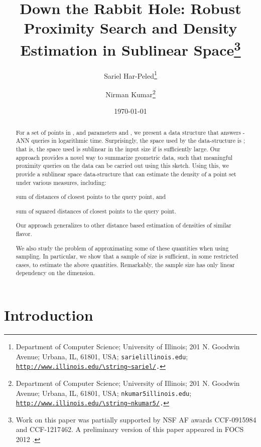 \documentclass[12pt]{article}
\makeatletter
\newcommand{\Term}[1]{\textsf{#1}}
\newcommand{\TermI}[1]{\Term{#1}\index{#1@\Term{#1}}}
\theoremstyle{remark}{\theorembodyfont{\rm} \newtheorem{remark}[theorem]{Remark}}
\newcommand{\SarielThanks}[1]{\thanks{Department of Computer
      Science; 
      University of Illinois; 
      201 N. Goodwin Avenue;
      Urbana, IL, 61801, USA;
      {\tt sariel\atgen{}illinois.edu}; {\tt
         \url{http://www.illinois.edu/\string~sariel/}.} #1}}
\newcommand{\NirmanThanks}[1]{\thanks{Department of Computer
      Science; 
      University of Illinois; 
      201 N. Goodwin Avenue;
      Urbana, IL, 61801, USA;
      {\tt \si{nkumar5}\atgen{}illinois.edu}; {\tt
         \url{http://www.illinois.edu/\string~\si{nkumar5}/}.} #1}}
\newcommand{\atgen}{\symbol{'100}}
\providecommand{\si}[1]{#1}
\newcommand{\ANN}{\TermI{ANN}\xspace}
\makeatother
\begin{document}
\title{Down the Rabbit Hole: Robust Proximity Search and Density
   Estimation in Sublinear Space\footnote{Work on this paper was partially supported by NSF AF awards
      CCF-0915984 and CCF-1217462. A preliminary version of this paper appeared in FOCS 2012
      \cite{hk-drhrp-12}.}}


\author{Sariel Har-Peled\SarielThanks{}\and Nirman Kumar\NirmanThanks{}}

\date{\today}



\maketitle


\begin{abstract}
    For a set of  points in , and parameters  and ,
    we present a data structure that answers -\ANN queries
    in logarithmic time.  Surprisingly, the space used by the
    data-structure is ; that is, the space used is
    sublinear in the input size if  is sufficiently large. Our
    approach provides a novel way to summarize geometric data, such
    that meaningful proximity queries on the data can be carried out
    using this sketch. Using this, we provide a sublinear space
    data-structure that can estimate the density of a point set under
    various measures, including:
    \begin{inparaenum}[(i)]
        \item sum of distances of  closest points to the query
        point, and
        \item sum of squared distances of  closest points to the
        query point.
    \end{inparaenum}
    Our approach generalizes to other distance based estimation of
    densities of similar flavor.

    We also study the problem of approximating some of these
    quantities when using sampling. In particular, we show that a
    sample of size  is sufficient, in some restricted
    cases, to estimate the above quantities. Remarkably, the sample
    size has only linear dependency on the dimension.
\end{abstract}


\section{Introduction}
\end{document}

